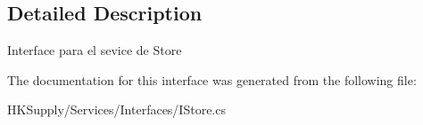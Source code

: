 \subsection{Detailed Description}
Interface para el sevice de Store 



The documentation for this interface was generated from the following file\+:\begin{DoxyCompactItemize}
\item 
H\+K\+Supply/\+Services/\+Interfaces/I\+Store.\+cs\end{DoxyCompactItemize}

